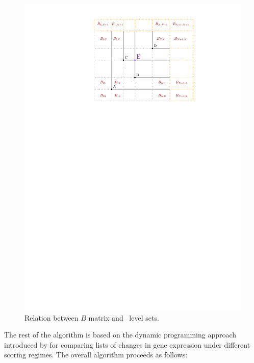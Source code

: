 \begin{figure}
	\centering \includegraphics[scale=1]{./img/KS2.pdf}
	\caption{Relation between $B$ matrix and \ecdf\, level sets.}\label{spaceDivision}
\end{figure}


The rest of the algorithm is based on the dynamic programming approach introduced by \citet*{NiVingron} for comparing lists of changes in gene expression under different scoring regimes. The overall algorithm proceeds as follows:


